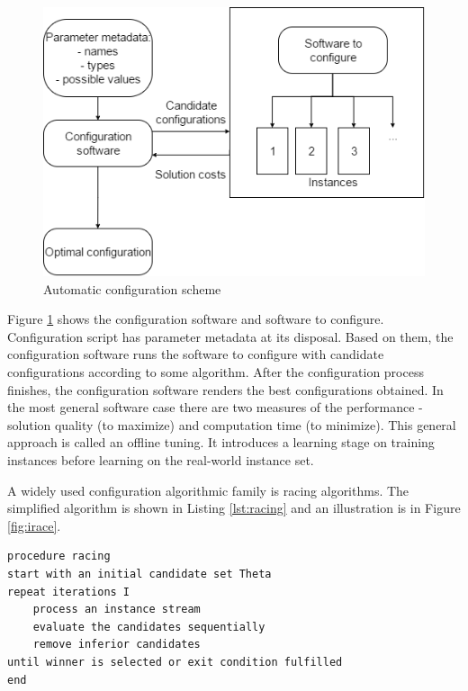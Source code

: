 \documentclass[11pt,a4paper,oneside]{book}
\begin{document}
\begin{figure}
  \centering
    \includegraphics[scale=0.7]{configuration-top-level.png}
  \caption{Automatic configuration scheme}
  \label{fig:autoconf}
\end{figure}

Figure \ref{fig:autoconf} shows the configuration software and software to configure. Configuration script has parameter metadata at its disposal. Based on them, the configuration software runs the software to configure with candidate configurations according to some algorithm. After the configuration process finishes, the configuration software renders the best configurations obtained. In the most general software case there are two measures of the performance - solution quality (to maximize) and computation time (to minimize). This general approach is called an offline tuning. It introduces a learning stage on training instances before learning on the real-world instance set.


A widely used configuration algorithmic family is racing algorithms. The simplified algorithm is shown in Listing \ref{lst:racing} and an illustration is in Figure \ref{fig:irace}.


\begin{minipage}[c, breaklines=true]{0.95\textwidth}
\begin{lstlisting}[caption={General racing pseudo-code}, label={lst:racing}]
procedure racing
start with an initial candidate set Theta
repeat iterations I
	process an instance stream
	evaluate the candidates sequentially
	remove inferior candidates
until winner is selected or exit condition fulfilled
end
\end{lstlisting}
\end{minipage}
\end{document}
